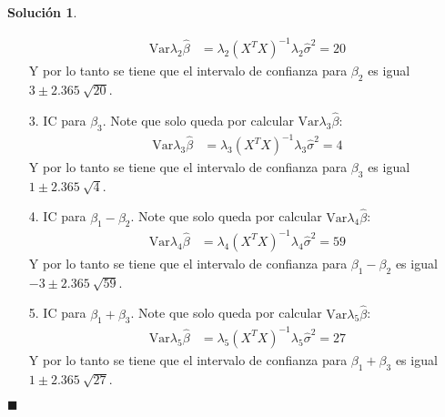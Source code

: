 \documentclass[12pt]{article}
\theoremstyle{plain}
\theoremstyle{definition}
\theoremstyle{definition}
\theoremstyle{definition}
\newtheorem*{solution}{Solución}
\newcommand{\p}{\text{.}}
\newcommand{\var}{\text{Var}}
\begin{document}
\begin{solution}
\begin{itemize}
    \begin{align*}
        \var \lambda_2 \hat \beta &= \lambda_2 (X^TX)^{-1} \lambda_2 \hat{\sigma}^2 = 20
    \end{align*}
    Y por lo tanto se tiene que el intervalo de confianza para $\beta_2$ es igual $3 \pm 2\p365 \ \sqrt{20}$.
    \item[3.] IC para $\beta_3$. Note que solo queda por calcular $\var \lambda_3 \hat \beta$: 
    \begin{align*}
        \var \lambda_3 \hat \beta &= \lambda_3 (X^TX)^{-1} \lambda_3 \hat{\sigma}^2 = 4
    \end{align*}
    Y por lo tanto se tiene que el intervalo de confianza para $\beta_3$ es igual $1 \pm 2\p365 \ \sqrt{4}$.
    \item[4.] IC para $\beta_1-\beta_2$. Note que solo queda por calcular $\var \lambda_4 \hat \beta$: 
    \begin{align*}
        \var \lambda_4 \hat \beta &= \lambda_4 (X^TX)^{-1} \lambda_4 \hat{\sigma}^2 = 59
    \end{align*}
    Y por lo tanto se tiene que el intervalo de confianza para $\beta_1 - \beta_2$ es igual $-3 \pm 2\p365 \ \sqrt{59}$.
    \item[5.] IC para $\beta_1+\beta_3$. Note que solo queda por calcular $\var \lambda_5 \hat \beta$: 
    \begin{align*}
        \var \lambda_5 \hat \beta &= \lambda_5 (X^TX)^{-1} \lambda_5 \hat{\sigma}^2 = 27
    \end{align*}
    Y por lo tanto se tiene que el intervalo de confianza para $\beta_1 + \beta_3$ es igual $1 \pm 2\p365 \ \sqrt{27}$.    
\end{itemize}
\end{solution}
\begin{flushright}
$\blacksquare$
\end{flushright}




   
\end{document}
